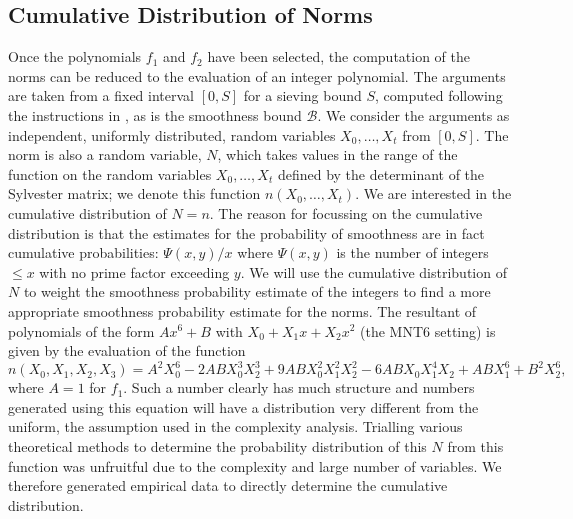 \documentclass[a4paper, 12pt, envcountsect, runningheads]{llncs}
\numberwithin{figure}{section}
\numberwithin{equation}{section}
\begin{document}
\subsection{Cumulative Distribution of Norms}
\label{ss:norms_dist}
Once the polynomials $f_1$ and $f_2$ have been selected, the computation of the norms can be reduced to the evaluation of an integer polynomial. The arguments are taken from a fixed interval $[0,S]$ for a sieving bound $S$, computed following the instructions in \cite{joux-lercier-smart-vercauteren06}, as is the smoothness bound $\mathcal{B}$. We consider the arguments  as independent, uniformly distributed, random variables $X_0,\ldots,X_t$ from $[0,S]$. The norm is also a random variable, $N$, which takes values in the range of the function on the random variables $X_0,\ldots,X_t$ defined by the determinant of the Sylvester matrix; we denote this function $n(X_0,\ldots,X_t)$. We are interested in the cumulative distribution of $N=n$. 
The reason for focussing on the cumulative distribution is that the estimates for the probability of smoothness are in fact cumulative probabilities: $\Psi(x,y)/x$ where $\Psi(x,y)$ is the number of integers $\leq x$ with no prime factor exceeding $y$. We will use the cumulative distribution of $N$ to weight the smoothness probability estimate of the integers to find a more appropriate smoothness probability estimate for the norms.
The resultant of polynomials of the form $Ax^6+B$ with $X_0+X_1 x +X_2 x^2$ (the MNT6 setting) is given by the evaluation of the function {\small{$$n(X_0,X_1,X_2,X_3)=A^2 X_0^6 - 2 A B X_0^3 X_2^3 + 9 A B X_0^2 X_1^2 X_2^2 - 6 A B X_0 X_1^4 X_2 + ABX_1^6 + B^2 X_2^6,$$}} where $A=1$ for $f_1$. Such a number clearly has much structure and numbers generated using this equation will have a distribution very different from the uniform, the assumption used in the complexity analysis. Trialling various theoretical methods to determine the probability distribution of this $N$ from this function was unfruitful due to the complexity and large number of variables. We therefore generated empirical data to directly determine the cumulative distribution. 
\end{document}
